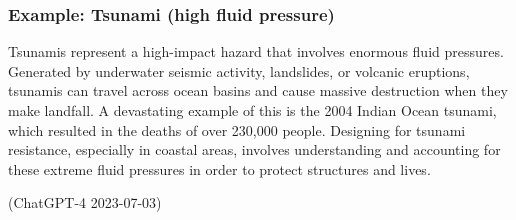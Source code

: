 \subsubsection{Example: Tsunami (high fluid pressure)}
\begin{quoting}
    Tsunamis represent a high-impact hazard that involves enormous fluid pressures. Generated by underwater seismic activity, landslides, or volcanic eruptions, tsunamis can travel across ocean basins and cause massive destruction when they make landfall. A devastating example of this is the 2004 Indian Ocean tsunami, which resulted in the deaths of over 230,000 people. Designing for tsunami resistance, especially in coastal areas, involves understanding and accounting for these extreme fluid pressures in order to protect structures and lives.

    (ChatGPT-4 2023-07-03)
\end{quoting}